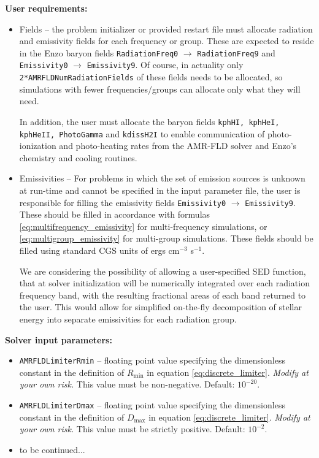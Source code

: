 \documentclass[10pt]{article}
\renewcommand{\(}{\left(}
\renewcommand{\)}{\right)}
\begin{document}
{\bf User requirements:}
\begin{itemize}
\item Fields -- the problem initializer or provided restart file must
  allocate radiation and emissivity fields for each frequency or
  group.  These are expected to reside in the Enzo baryon fields 
  {\tt RadiationFreq0} $\to$ {\tt RadiationFreq9} and {\tt Emissivity0} 
  $\to$ {\tt Emissivity9}.  Of course, in actuality only \\
  {\tt 2*AMRFLDNumRadiationFields} of these fields needs to be
  allocated, so simulations with fewer frequencies/groups can allocate
  only what they will need.

  In addition, the user must allocate the baryon fields {\tt kphHI,
  kphHeI, kphHeII, PhotoGamma} and {\tt kdissH2I} to enable communication 
  of photo-ionization and photo-heating rates from the AMR-FLD solver and 
  Enzo's chemistry and cooling routines.

\item Emissivities -- For problems in which the set of emission
  sources is unknown at run-time and cannot be specified in the input
  parameter file, the user is responsible for filling the emissivity
  fields {\tt Emissivity0} $\to$ {\tt Emissivity9}.  These should be
  filled in accordance with formulas
  \eqref{eq:multifrequency_emissivity} for multi-frequency
  simulations, or \eqref{eq:multigroup_emissivity} for multi-group
  simulations.  These fields should be filled using standard CGS units
  of ergs cm$^{-3}$ s$^{-1}$.

  We are considering the possibility of allowing a user-specified SED
  function, that at solver initialization will be numerically
  integrated over each radiation frequency band, with the resulting
  fractional areas of each band returned to the user.  This would
  allow for simplified on-the-fly decomposition of stellar energy into
  separate emissivities for each radiation group.
\end{itemize}


{\bf Solver input parameters:}
\begin{itemize}
\item {\tt AMRFLDLimiterRmin} -- floating point value specifying the
  dimensionless constant in the definition of $R_{\text{min}}$ in
  equation \eqref{eq:discrete_limiter}.  {\em Modify at your own
    risk.}  This value must be non-negative.  Default: $10^{-20}$.
\item {\tt AMRFLDLimiterDmax} -- floating point value specifying the
  dimensionless constant in the definition of $D_{\text{max}}$ in
  equation \eqref{eq:discrete_limiter}.  {\em Modify at your own
    risk.}  This value must be strictly positive.  Default: $10^{-2}$.
\item to be continued...
\end{itemize}





\end{document}
